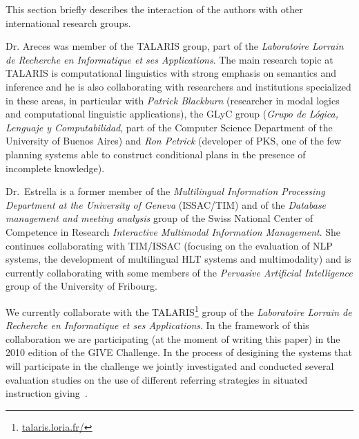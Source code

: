 This section briefly describes the interaction of the authors with other
international research groups. 

Dr. Areces was member of the TALARIS group, part of the \emph{Laboratoire
Lorrain de Recherche en Informatique et ses Applications}. The main research
topic at TALARIS is computational linguistics with strong emphasis on semantics
and inference and he is also collaborating with researchers and institutions
specialized in these areas, in particular with \textit{Patrick Blackburn}
(researcher in modal logics and computational linguistic applications), the GLyC
group (\textit{Grupo de L\'ogica, Lenguaje y Computabilidad}, part of the
Computer Science Department of the University of Buenos Aires) and \textit{Ron
Petrick} (developer of PKS, one of the few planning systems able to construct
conditional plans in the presence of incomplete knowledge). 


Dr.\ Estrella is a former member of the \textit{Multilingual Information
Processing Department at the University of Geneva} (ISSAC/TIM) and of the
\emph{Database management
and meeting
analysis} group of the Swiss National Center of Competence in Research                                                                                                                                                                                                                                                                                                                                                                                                                                                                                                                                                                                                                                                                                                                                            
\emph{Interactive Multimodal Information Management}. She continues
collaborating with TIM/ISSAC (focusing on the evaluation of NLP systems, the
development of multilingual HLT systems and multimodality) and is currently
collaborating with some members of the \textit{Pervasive Artificial
Intelligence} group of the University of Fribourg. 

We currently collaborate with the TALARIS\footnote{\url{talaris.loria.fr/}}
group of the \emph{Laboratoire Lorrain de Recherche en Informatique et ses
Applications}. In the framework of this collaboration we are participating
(at the moment of writing this paper) in the 2010 edition of the GIVE
Challenge. In the process of desigining the systems that will participate in
the challenge we jointly investigated and conducted several evaluation studies
on the use of different referring strategies in situated instruction
giving~\cite{amoia10}. 

